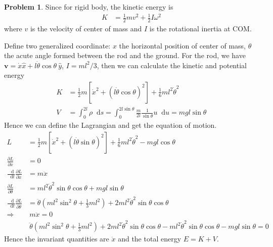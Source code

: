 \documentclass[twoside,11pt]{article}
\newcommand{\lms}{\fontfamily{lmss}\selectfont} %
\renewcommand*\d{\mathop{}\!\mathrm{d}}
\theoremstyle{definition}
\newtheorem{problem}{\lms Problem}
\theoremstyle{remark}
\begin{document}
\begin{problem}
Since for rigid body, the kinetic energy is
\begin{align*}
    K &= \frac{1}{2}mv^2 + \frac{1}{2}I\omega^2
\end{align*}
where $v$ is the velocity of center of mass and $I$ is the rotational inertia at COM.

Define two generalized coordinate: $x$ the horizontal position of center of mass, 
$\theta$ the acute angle formed between the rod and the ground.
For the rod, we have $\mathbf{v}=\dot{x}\hat{x} + l\dot{\theta}\cos\theta~\hat{y}$,
$I = ml^2/3$,
then we can calculate the kinetic and potential energy
\begin{align*}
    K &= \frac{1}{2}m[\dot{x}^2 + (l\dot{\theta}\cos\theta)^2] + \frac{1}{6}ml^2\dot{\theta}^2\\
    V &= \int_0^{2l}\rho\d s = \int_0^{2l\sin\theta}\frac{m}{2l}\frac{1}{\sin\theta} u\d u = mgl\sin\theta
\end{align*}
Hence we can define the Lagrangian and get the equation of motion.
\begin{align*}
    L &= \frac{1}{2}m[\dot{x}^2 + (l\dot{\theta}\sin\theta)^2]
    + \frac{1}{6}ml^2\dot{\theta}^2 - mgl\cos\theta\\
    \frac{\partial L}{\partial x} &= 0\\
    \frac{\d}{\d t}\frac{\partial L}{\partial\dot{x}} &= m\ddot{x}\\
    \frac{\partial L}{\partial \theta} &= 
    ml^2\dot{\theta}^2\sin\theta\cos\theta
    + mgl\sin\theta\\
    \frac{\d}{\d t}\frac{\partial L}{\partial\dot{\theta}} &= 
    \ddot{\theta}\left(
        ml^2\sin^2\theta + \frac{1}{3}ml^2
    \right)
    + 2ml^2\dot{\theta}^2\sin\theta\cos\theta\\
    \Rightarrow
    &~m\ddot{x} = 0\\
    &~\ddot{\theta}\left(
        ml^2\sin^2\theta + \frac{1}{3}ml^2
    \right)
    + 2ml^2\dot{\theta}^2\sin\theta\cos\theta
    - ml^2\dot{\theta}^2\sin\theta\cos\theta
    - mgl\sin\theta = 0
\end{align*}
Hence the invariant quantities are $\dot{x}$ and the total energy $E=K+V$.

\end{problem}



\end{document}
